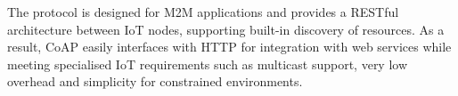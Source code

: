 The protocol is designed for M2M applications and provides a RESTful architecture between IoT nodes, supporting built-in discovery of resources. As a result, CoAP easily interfaces with HTTP for integration with web services while meeting specialised IoT requirements such as multicast support, very low overhead and simplicity for constrained environments. 





